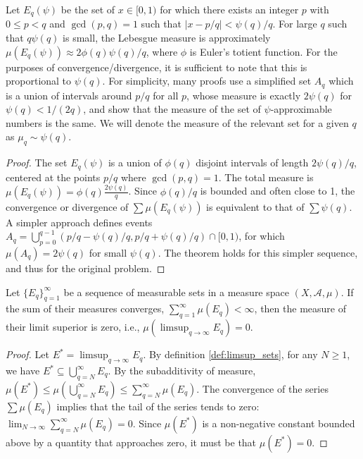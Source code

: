 \begin{lemma}
    \label{lem:Measure_of_Eq}
    Let $E_q(\psi)$ be the set of $x \in [0, 1)$ for which there exists an integer $p$ with $0 \le p < q$ and $\gcd(p,q)=1$ such that $|x - p/q| < \psi(q)/q$. For large $q$ such that $q\psi(q)$ is small, the Lebesgue measure is approximately $\mu(E_q(\psi)) \approx 2\phi(q)\psi(q)/q$, where $\phi$ is Euler's totient function. For the purposes of convergence/divergence, it is sufficient to note that this is proportional to $\psi(q)$. For simplicity, many proofs use a simplified set $A_q$ which is a union of intervals around $p/q$ for all $p$, whose measure is exactly $2\psi(q)$ for $\psi(q) < 1/(2q)$, and show that the measure of the set of $\psi$-approximable numbers is the same. We will denote the measure of the relevant set for a given $q$ as $\mu_q \sim \psi(q)$.
\end{lemma}

\begin{proof}
    The set $E_q(\psi)$ is a union of $\phi(q)$ disjoint intervals of length $2\psi(q)/q$, centered at the points $p/q$ where $\gcd(p,q)=1$. The total measure is $\mu(E_q(\psi)) = \phi(q) \frac{2\psi(q)}{q}$. Since $\phi(q)/q$ is bounded and often close to 1, the convergence or divergence of $\sum \mu(E_q(\psi))$ is equivalent to that of $\sum \psi(q)$. A simpler approach defines events $A_q = \bigcup_{p=0}^{q-1} (p/q - \psi(q)/q, p/q + \psi(q)/q) \cap [0,1)$, for which $\mu(A_q) = 2\psi(q)$ for small $\psi(q)$. The theorem holds for this simpler sequence, and thus for the original problem.
\end{proof}

\begin{lemma}
    \label{lem:First_Borel-Cantelli}
    Let $\{E_q\}_{q=1}^\infty$ be a sequence of measurable sets in a measure space $(X, \mathcal{A}, \mu)$. If the sum of their measures converges, $\sum_{q=1}^{\infty} \mu(E_q) < \infty$, then the measure of their limit superior is zero, i.e., $\mu(\limsup_{q\to\infty} E_q) = 0$.
\end{lemma}

\begin{proof}
    Let $E^* = \limsup_{q\to\infty} E_q$. By definition \ref{def:limsup_sets}, for any $N \ge 1$, we have $E^* \subseteq \bigcup_{q=N}^{\infty} E_q$.
    By the subadditivity of measure, $\mu(E^*) \le \mu\left(\bigcup_{q=N}^{\infty} E_q\right) \le \sum_{q=N}^{\infty} \mu(E_q)$.
    The convergence of the series $\sum \mu(E_q)$ implies that the tail of the series tends to zero: $\lim_{N\to\infty} \sum_{q=N}^{\infty} \mu(E_q) = 0$.
    Since $\mu(E^*)$ is a non-negative constant bounded above by a quantity that approaches zero, it must be that $\mu(E^*) = 0$.
\end{proof}

